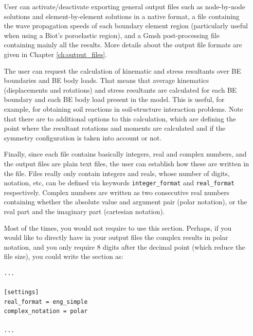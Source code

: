 \documentclass[a4paper,fleqn]{book}
\begin{document}
User can activate/deactivate exporting general output files such as node-by-node solutions and element-by-element solutions in a native format, a file containing the wave propagation speeds of each boundary element region (particularly useful when using a Biot's poroelastic region), and a Gmsh post-processing file containing mainly all the results. More details about the output file formats are given in Chapter \ref{ch:output_files}.

The user can request the calculation of kinematic and stress resultants over BE boundaries and BE body loads. That means that average kinematics (displacements and rotations) and stress resultants are calculated for each BE boundary and each BE body load present in the model. This is useful, for example, for obtaining soil reactions in soil-structure interaction problems. Note that there are to additional options to this calculation, which are defining the point where the resultant rotations and moments are calculated and if the symmetry configuration is taken into account or not.

Finally, since each file contains basically integers, real and complex numbers, and the output files are plain text files, the user can establish how these are written in the file. Files really only contain integers and reals, whose number of digits, notation, etc, can be defined via keywords \texttt{integer\_format} and \texttt{real\_format} respectively. Complex numbers are written as two consecutive real numbers containing whether the absolute value and argument pair (polar notation), or the real part and the imaginary part (cartesian notation).

Most of the times, you would not require to use this section. Perhaps, if you would like to directly have in your output files the complex results in polar notation, and you only require 8 digits after the decimal point (which reduce the file size), you could write the section as:
\begin{Verbatim}[frame=single, fontsize=\small, label=input.dat]
...

[settings]
real_format = eng_simple
complex_notation = polar

...
\end{Verbatim}
\end{document}

